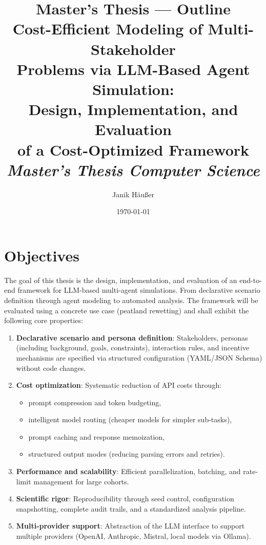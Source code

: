 \documentclass[12pt, a4paper]{article}
\title{%
    \vspace{-1cm}
    \textbf{Master's Thesis --- Outline}\\[0.8em]
    \Large Cost-Efficient Modeling of Multi-Stakeholder\\
    Problems via LLM-Based Agent Simulation:\\[0.3em]
    Design, Implementation, and Evaluation\\
    of a Cost-Optimized Framework\\[1em]
    \normalsize\textit{Master's Thesis Computer Science}
}
\author{Janik Häußer}
\date{\today}
\begin{document}
\maketitle
\thispagestyle{empty}

\newpage
\setcounter{page}{1}

\section{Objectives}

The goal of this thesis is the design, implementation, and evaluation of an end-to-end framework for LLM-based multi-agent simulations. From declarative scenario definition through agent modeling to automated analysis. The framework will be evaluated using a concrete use case (peatland rewetting) and shall exhibit the following core properties:

\begin{enumerate}
    \item \textbf{Declarative scenario and persona definition}: Stakeholders, personas (including background, goals, constraints), interaction rules, and incentive mechanisms are specified via structured configuration (YAML/JSON Schema) without code changes.

    \item \textbf{Cost optimization}: Systematic reduction of API costs through:
    \begin{itemize}
        \item prompt compression and token budgeting,
        \item intelligent model routing (cheaper models for simpler sub-tasks),
        \item prompt caching and response memoization,
        \item structured output modes (reducing parsing errors and retries).
    \end{itemize}

    \item \textbf{Performance and scalability}: Efficient parallelization, batching, and rate-limit management for large cohorts.

    \item \textbf{Scientific rigor}: Reproducibility through seed control, configuration snapshotting, complete audit trails, and a standardized analysis pipeline.

    \item \textbf{Multi-provider support}: Abstraction of the LLM interface to support multiple providers (OpenAI, Anthropic, Mistral, local models via Ollama).
\end{enumerate}
\end{document}
